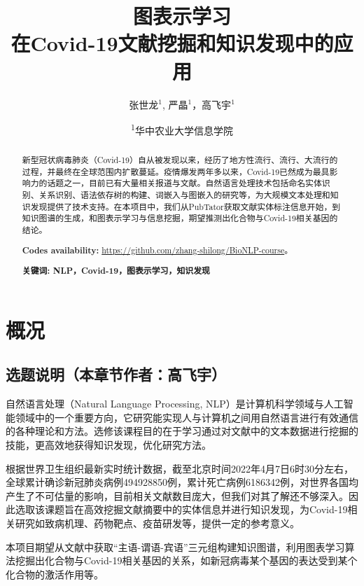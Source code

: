 \documentclass[twocolumn]{article}
\title{图表示学习\\在Covid-19文献挖掘和知识发现中的应用}
\author{张世龙$^{1}$, 严晶$^{1}$，高飞宇$^{1}$}
\date{
\textsuperscript{1}华中农业大学信息学院}
\begin{document}
\maketitle

\begin{abstract}
新型冠状病毒肺炎（Covid-19）自从被发现以来，经历了地方性流行、流行、大流行的过程，并最终在全球范围内扩散蔓延。疫情爆发两年多以来，Covid-19已然成为最具影响力的话题之一，目前已有大量相关报道与文献。自然语言处理技术包括命名实体识别、关系识别、语法依存树的构建、词嵌入与图嵌入的研究等，为大规模文本处理和知识发现提供了技术支持。在本项目中，我们从PubTator获取文献实体标注信息开始，到知识图谱的生成，和图表示学习与信息挖掘，期望推测出化合物与Covid-19相关基因的结论。\par
{\bf Codes availability:} \url{https://github.com/zhang-shilong/BioNLP-course}。\par
{\bf 关键词: NLP，Covid-19，图表示学习，知识发现}
\end{abstract}

\maketitle

\section{概况}
\subsection{选题说明（本章节作者：高飞宇）}
自然语言处理（Natural Language Processing, NLP）是计算机科学领域与人工智能领域中的一个重要方向，它研究能实现人与计算机之间用自然语言进行有效通信的各种理论和方法。选修该课程目的在于学习通过对文献中的文本数据进行挖掘的技能，更高效地获得知识发现，优化研究方法。\par
根据世界卫生组织最新实时统计数据，截至北京时间2022年4月7日6时30分左右，全球累计确诊新冠肺炎病例494928850例，累计死亡病例6186342例，对世界各国均产生了不可估量的影响，目前相关文献数目庞大，但我们对其了解还不够深入。因此选取该课题旨在高效挖掘文献摘要中的实体信息并进行知识发现，为Covid-19相关研究如致病机理、药物靶点、疫苗研发等，提供一定的参考意义。\par
本项目期望从文献中获取“主语-谓语-宾语”三元组构建知识图谱，利用图表学习算法挖掘出化合物与Covid-19相关基因的关系，如新冠病毒某个基因的表达受到某个化合物的激活作用等。\par
\end{document}
